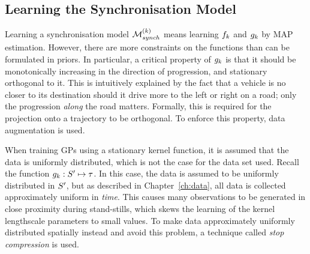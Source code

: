 \subsection{Learning the Synchronisation Model}
Learning a synchronisation model $\mathcal{M}_{synch}^{(k)}$ means learning
$f_{k}$ and $g_{k}$ by MAP estimation. However, there are
more constraints on the functions than can be formulated in
priors. In particular, a critical property of $g_{k}$
is that it should be monotonically increasing in the direction of progression,
and stationary orthogonal to it. This is intuitively explained by the fact that a
vehicle is no closer to its destination should it drive more to the
left or right on a road; only the progression \textit{along} the road
matters. Formally, this is required for the projection onto a
trajectory to be orthogonal. To enforce this property, data augmentation is used.

When training GPs using a stationary kernel function, it is assumed
that the data is uniformly distributed, which is not the case for the
data set used. Recall the function $g_{k} : S' \mapsto
\tau$. In this case, the data is assumed to be uniformly
distributed in $S'$, but as described in Chapter~\ref{ch:data},
all data is collected approximately uniform in \textit{time}. This causes many
observations to be generated in close proximity during stand-stills, which skews the
learning of the kernel lengthscale parameters to small values. To
make data approximately uniformly distributed spatially instead and 
avoid this problem, a technique called \textit{stop compression} is used.


